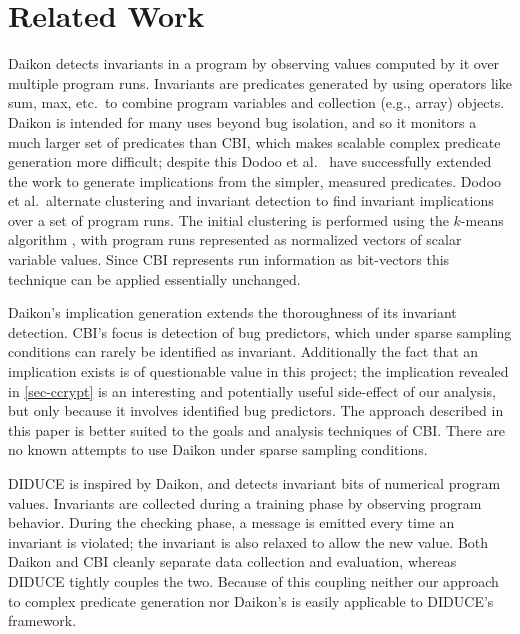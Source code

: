
\section{Related Work}
\label{sec-related-work}
Daikon \cite{ErnstPGMPTX2006} detects invariants in a program by observing values computed by it over multiple program runs.  Invariants are predicates generated by using operators like sum, max, etc.\ to combine program variables and collection (e.g., array) objects.  Daikon is intended for many uses beyond bug isolation, and so it monitors a much larger set of predicates than CBI, which makes scalable complex predicate generation more difficult; despite this Dodoo et al.\ \cite{ErnstDRAFT} have successfully extended the work to generate implications from the simpler, measured predicates.  Dodoo et al.\ alternate clustering and invariant detection to find invariant implications over a set of program runs.  The initial clustering is performed using the $k$-means algorithm \cite{jain99data}, with program runs represented as normalized vectors of scalar variable values.  Since CBI represents run information as bit-vectors this technique can be applied essentially unchanged.

Daikon's implication generation extends the thoroughness of its invariant detection.  CBI's focus is detection of bug predictors, which under sparse sampling conditions can rarely be identified as invariant.  Additionally the fact that an implication exists is of questionable value in this project; the implication revealed in \autoref{sec-ccrypt} is an interesting and potentially useful side-effect of our analysis, but only because it involves identified bug predictors.  The approach described in this paper is better suited to the goals and analysis techniques of CBI\@.  There are no known attempts to use Daikon under sparse sampling conditions.

DIDUCE \cite{581377} is inspired by Daikon, and detects invariant bits of numerical program values.  Invariants are collected during a training phase by observing program behavior.  During the checking phase, a message is emitted every time an invariant is violated; the invariant is also relaxed to allow the new value.  Both Daikon and CBI cleanly separate data collection and evaluation, whereas DIDUCE tightly couples the two.  Because of this coupling neither our approach to complex predicate generation nor Daikon's is easily applicable to DIDUCE's framework.

